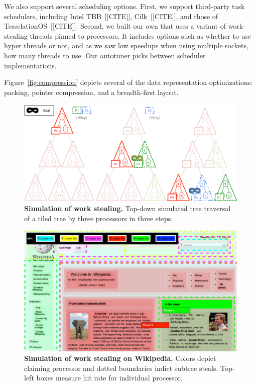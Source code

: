 \begin{itemize}
We also support several scheduling options. First, we support third-party task schedulers, including Intel TBB~[[CITE]], Cilk~[[CITE]], and those of TesselationOS~[[CITE]]. Second, we built our own that uses a variant of work-stealing threads pinned to processors. It includes options such as whether to use hyper threads or not, and as we saw low speedups when using multiple sockets, how many threads to  use. Our autotuner picks between scheduler implementations.

\end{itemize}

Figure~\ref{fig:compression} depicts several of the data representation optimizations: packing, pointer compression, and a breadth-first layout. 




\begin{figure}
\centering
\includegraphics[width=1.0\columnwidth]{chapter6/wssimulation}
\caption{\textbf{Simulation of work stealing.} Top-down simulated tree traversal of a tiled tree by three processors in three steps.}
\label{fig:wssimulation}
\end{figure}


\begin{figure}
\centering
\includegraphics[width=1.0\columnwidth]{chapter6/workstealviz}
\caption{\textbf{Simulation of work stealing on Wikipedia.} Colors depict claiming processor and dotted boundaries indict subtree steals. Top-left boxes measure hit rate for individual processor.}
\label{fig:wswikipedia}
\end{figure}



